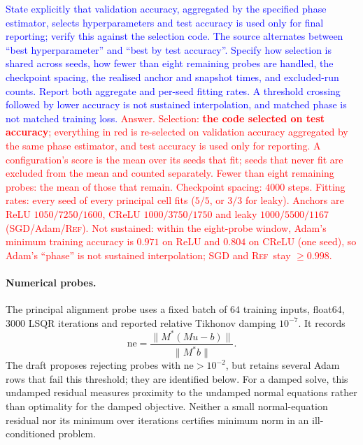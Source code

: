 \documentclass{article}
\newcommand{\zied}[1]{\textcolor{blue}{#1}}
\newcommand{\nat}[1]{\textcolor{red}{#1}}
\newcommand{\TOU}{\textsc{Ref}}
\theoremstyle{definition}
\theoremstyle{remark}
\begin{document}
\zied{State explicitly that validation accuracy, aggregated by the specified phase estimator, selects hyperparameters and test accuracy is used only for final reporting; verify this against the selection code. The source alternates between ``best hyperparameter'' and ``best by test accuracy''. Specify how selection is shared across seeds, how fewer than eight remaining probes are handled, the checkpoint spacing, the realised anchor and snapshot times, and excluded-run counts. Report both aggregate and per-seed fitting rates. A threshold crossing followed by lower accuracy is not sustained interpolation, and matched phase is not matched training loss.}
\nat{Answer. Selection: \textbf{the code selected on test accuracy}; everything in red is re-selected on validation accuracy aggregated by the same phase estimator, and test accuracy is used only for reporting. A configuration's score is the mean over its seeds that fit; seeds that never fit are excluded from the mean and counted separately. Fewer than eight remaining probes: the mean of those that remain. Checkpoint spacing: $4000$ steps. Fitting rates: every seed of every principal cell fits ($5/5$, or $3/3$ for leaky). Anchors are ReLU $1050/7250/1600$, CReLU $1000/3750/1750$ and leaky $1000/5500/1167$ (SGD/Adam/\TOU). Not sustained: within the eight-probe window, Adam's minimum training accuracy is $0.971$ on ReLU and $0.804$ on CReLU (one seed), so Adam's ``phase'' is not sustained interpolation; SGD and \TOU\ stay $\ge0.998$.}

\paragraph{Numerical probes.}
The principal alignment probe uses a fixed batch of $64$ training inputs, float64, $3000$ LSQR iterations and reported relative Tikhonov damping $10^{-7}$. It records
\[
 \mathrm{ne}=\frac{\|M^*(Mu-b)\|}{\|M^*b\|}.
\]
The draft proposes rejecting probes with $\mathrm{ne}>10^{-2}$, but retains several Adam rows that fail this threshold; they are identified below. For a damped solve, this undamped residual measures proximity to the undamped normal equations rather than optimality for the damped objective. Neither a small normal-equation residual nor its minimum over iterations certifies minimum norm in an ill-conditioned problem.
\end{document}
